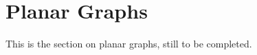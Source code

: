 \section{Planar Graphs} \label{sec:planar}

This is the section on planar graphs, still to be completed.
